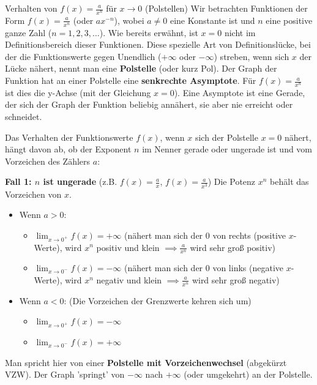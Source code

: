 \begin{merksatzumgebung}{Verhalten von $f(x) = \frac{a}{x^n}$ für $x \to 0$ (Polstellen)}
Wir betrachten Funktionen der Form $f(x) = \frac{a}{x^n}$ (oder $ax^{-n}$), wobei $a \neq 0$ eine Konstante ist und $n$ eine positive ganze Zahl ($n=1, 2, 3, \dots$).
Wie bereits erwähnt, ist $x=0$ nicht im Definitionsbereich dieser Funktionen. Diese spezielle Art von Definitionslücke, bei der die Funktionswerte gegen Unendlich ($+\infty$ oder $-\infty$) streben, wenn sich $x$ der Lücke nähert, nennt man eine \textbf{Polstelle} (oder kurz Pol).
Der Graph der Funktion hat an einer Polstelle eine \textbf{senkrechte Asymptote}. Für $f(x) = \frac{a}{x^n}$ ist dies die y-Achse (mit der Gleichung $x=0$). Eine Asymptote ist eine Gerade, der sich der Graph der Funktion beliebig annähert, sie aber nie erreicht oder schneidet.

Das Verhalten der Funktionswerte $f(x)$, wenn $x$ sich der Polstelle $x=0$ nähert, hängt davon ab, ob der Exponent $n$ im Nenner gerade oder ungerade ist und vom Vorzeichen des Zählers $a$:

\textbf{Fall 1: $n$ ist ungerade} (z.B. $f(x) = \frac{a}{x}$, $f(x) = \frac{a}{x^3}$)
Die Potenz $x^n$ behält das Vorzeichen von $x$.
\begin{itemize}
    \item Wenn $a > 0$:
        \begin{itemize}
            \item $\lim_{x \to 0^+} f(x) = +\infty$ (nähert man sich der 0 von rechts (positive $x$-Werte), wird $x^n$ positiv und klein $\implies \frac{a}{x^n}$ wird sehr groß positiv)
            \item $\lim_{x \to 0^-} f(x) = -\infty$ (nähert man sich der 0 von links (negative $x$-Werte), wird $x^n$ negativ und klein $\implies \frac{a}{x^n}$ wird sehr groß negativ)
        \end{itemize}
    \item Wenn $a < 0$: (Die Vorzeichen der Grenzwerte kehren sich um)
        \begin{itemize}
            \item $\lim_{x \to 0^+} f(x) = -\infty$
            \item $\lim_{x \to 0^-} f(x) = +\infty$
        \end{itemize}
\end{itemize}
Man spricht hier von einer \textbf{Polstelle mit Vorzeichenwechsel} (abgekürzt VZW). Der Graph 'springt' von $-\infty$ nach $+\infty$ (oder umgekehrt) an der Polstelle.


\end{merksatzumgebung}
